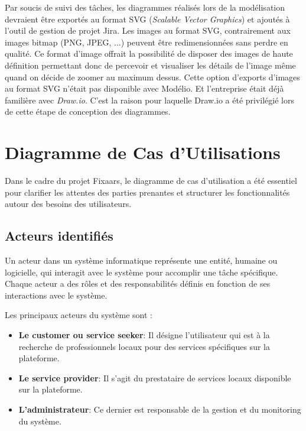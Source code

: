 {\vspace{0.35cm}

Par soucis de suivi des tâches, les diagrammes réalisés lors de la modélisation devraient être exportés au format SVG (\textit{Scalable Vector Graphics}) et ajoutés à l'outil de gestion de projet Jira. Les images au format SVG, contrairement aux images bitmap (PNG, JPEG, ...) peuvent être redimensionnées sans perdre en qualité. Ce format d'image offrait la possibilité de disposer des images de haute définition permettant donc de percevoir et visualiser les détails de l'image même quand on décide de zoomer au maximum dessus. Cette option d'exports d'images au format SVG n'était pas disponible avec Modélio. Et l'entreprise était déjà familière avec \textit{Draw.io}. C'est la raison pour laquelle Draw.io a été privilégié lors de cette étape de conception des diagrammes.

\section{Diagramme de Cas d'Utilisations}
Dans le cadre du projet Fixaars, le diagramme de cas d'utilisation a été essentiel pour clarifier les attentes des parties prenantes et structurer les fonctionnalités autour des besoins des utilisateurs.

\subsection{Acteurs identifiés}
Un acteur dans un système informatique représente une entité, humaine ou logicielle, qui interagit avec le système pour accomplir une tâche spécifique. Chaque acteur a des rôles et des responsabilités définis en fonction de ses interactions avec le système. 

\vspace{0.39cm}

Les principaux acteurs du système sont : 

\vspace{0.39cm}

\begin{itemize}
    \item \textbf{Le customer ou service seeker}: Il désigne l'utilisateur qui est à la recherche de professionnels locaux pour des services spécifiques sur la plateforme. 
    \item \textbf{Le service provider}: Il s'agit du prestataire de services locaux disponible sur la plateforme.
    \item \textbf{L'administrateur}: Ce dernier est responsable de la gestion et du monitoring du système.
\end{itemize}

}

